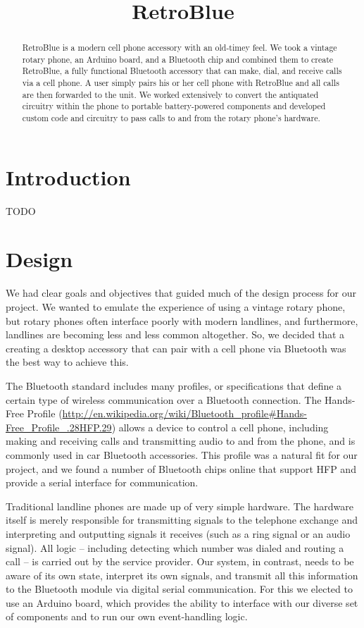 \documentclass{es50report}
\title{RetroBlue}
\begin{document}
    \maketitlepage

    \begin{abstract}
        RetroBlue is a modern cell phone accessory with an old-timey feel. We took a vintage rotary phone, an Arduino board, and a Bluetooth chip and combined them to create RetroBlue, a fully functional Bluetooth accessory that can make, dial, and receive calls via a cell phone. A user simply pairs his or her cell phone with RetroBlue and all calls are then forwarded to the unit. We worked extensively to convert the antiquated circuitry within the phone to portable battery-powered components and developed custom code and circuitry to pass calls to and from the rotary phone's hardware.
    \end{abstract}
    \newpage
    \doublespacing

    \section{Introduction}
    TODO

    \section{Design}
        We had clear goals and objectives that guided much of the design process for our project. We wanted to emulate the experience of using a vintage rotary phone, but rotary phones often interface poorly with modern landlines, and furthermore, landlines are becoming less and less common altogether. So, we decided that a creating a desktop accessory that can pair with a cell phone via Bluetooth was the best way to achieve this.
        
        The Bluetooth standard includes many profiles, or specifications that define a certain type of wireless communication over a Bluetooth connection. The Hands-Free Profile (\url{http://en.wikipedia.org/wiki/Bluetooth_profile#Hands-Free_Profile_.28HFP.29}) allows a device to control a cell phone, including making and receiving calls and transmitting audio to and from the phone, and is commonly used in car Bluetooth accessories. This profile was a natural fit for our project, and we found a number of Bluetooth chips online that support HFP and provide a serial interface for communication.
        
        Traditional landline phones are made up of very simple hardware. The hardware itself is merely responsible for transmitting signals to the telephone exchange and interpreting and outputting signals it receives (such as a ring signal or an audio signal). All logic -- including detecting which number was dialed and routing a call -- is carried out by the service provider. Our system, in contrast, needs to be aware of its own state, interpret its own signals, and transmit all this information to the Bluetooth module via digital serial communication. For this we elected to use an Arduino board, which provides the ability to interface with our diverse set of components and to run our own event-handling logic.
\end{document}
